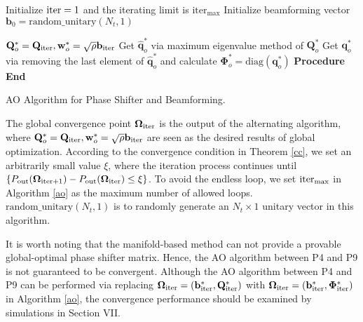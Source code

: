 \documentclass[journal]{IEEEtran}
\theoremstyle{definition}
\begin{document}
\begin{algorithm}
\small
{}
Initialize $\rm{iter}=1$ and the iterating limit is $\textrm{iter}_{\max}$\;
Initialize beamforming vector $\mathbf{b}_0=\text{random\_unitary}(N_t,1)$\;

$\mathbf{Q}_o^{*}=\mathbf{Q}_{\rm{iter}}, \mathbf{w}_o^*=\sqrt{\rho}\mathbf{b}_{\rm{iter}}$\;
Get $\hat{\mathbf{q}}^*_{o}$ via maximum eigenvalue method of $\mathbf{Q}_o^{*}$\;
Get $\mathbf{q}_{o}^*$ via removing the last element of $\hat{\mathbf{q}}^*_{o}$ and calculate $\bm{\Phi}^*_{o}=\text{diag}(\mathbf{q}^*_{o})$\;
\textbf{Procedure End}
\caption{AO Algorithm for Phase Shifter and Beamforming.} \label{ao}
\end{algorithm}


The global convergence point $\bm{\Omega}_{\rm{iter}}$ is the output of the alternating algorithm, where $\mathbf{Q}_o^{*}=\mathbf{Q}_{\rm{iter}}, \mathbf{w}_o^*=\sqrt{\rho}\mathbf{b}_{\rm{iter}}$ are seen as the desired results of global optimization. According to the convergence condition in Theorem \ref{cc}, we set an arbitrarily small value $\xi$, where the iteration process continues until $\{P_{\text{out}}(\bm{\Omega}_{\rm{iter}+1})-P_{\text{out}}(\bm{\Omega}_{\rm{iter}})\leq \xi\}$. To avoid the endless loop, we set $\rm{iter}_{\max}$ in Algorithm \ref{ao} as the maximum number of allowed loops. $\text{random\_unitary}(N_t,1)$ is to randomly generate an $N_t\times 1$ unitary vector in this algorithm. 

It is worth noting that the manifold-based method can not provide a provable global-optimal phase shifter matrix. Hence, the AO algorithm between P4 and P9 is not guaranteed to be convergent. Although the AO algorithm between P4 and P9 can be performed via replacing $\bm{\Omega}_{\rm{iter}}=(\mathbf{b}^*_{\rm{iter}}, \mathbf{Q}^*_{\rm{iter}})$ with $\bm{\Omega}_{\rm{iter}}=(\mathbf{b}^*_{\rm{iter}}, \bm{\Phi}^*_{\rm{iter}})$ in Algorithm \ref{ao}, the convergence performance should be examined by simulations in Section VII.
\end{document}
